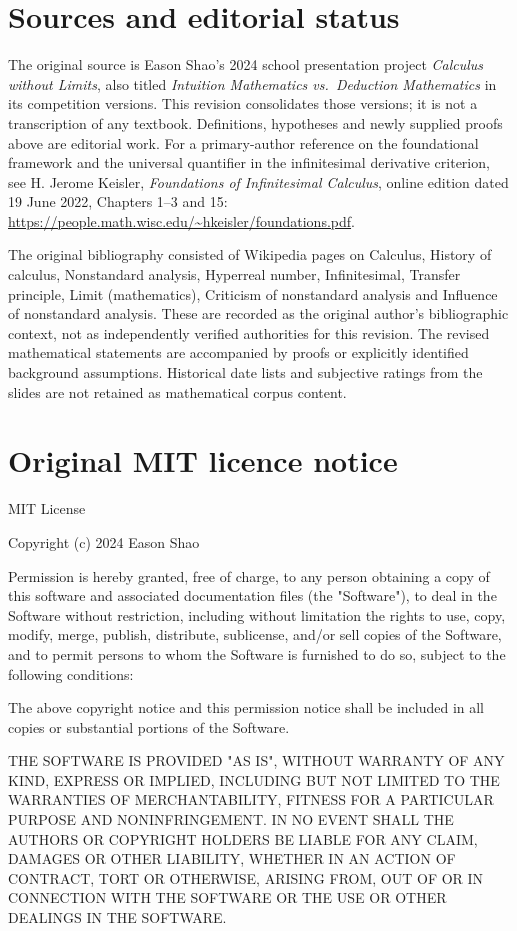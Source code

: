 \documentclass[11pt]{article}
\theoremstyle{definition}
\theoremstyle{remark}
\begin{document}
\section*{Sources and editorial status}
The original source is Eason Shao's 2024 school presentation project
\emph{Calculus without Limits}, also titled \emph{Intuition Mathematics vs.\ Deduction
Mathematics} in its competition versions. This revision consolidates those
versions; it is not a transcription of any textbook. Definitions, hypotheses
and newly supplied proofs above are editorial work.
For a primary-author reference on the foundational framework and the universal
quantifier in the infinitesimal derivative criterion, see H. Jerome Keisler,
\emph{Foundations of Infinitesimal Calculus}, online edition dated 19 June 2022,
Chapters 1--3 and 15:
\url{https://people.math.wisc.edu/~hkeisler/foundations.pdf}.

The original bibliography consisted of Wikipedia pages on Calculus,
History of calculus, Nonstandard analysis, Hyperreal number, Infinitesimal,
Transfer principle, Limit (mathematics), Criticism of nonstandard analysis and
Influence of nonstandard analysis. These are recorded as the original author's
bibliographic context, not as independently verified authorities for this revision.
The revised mathematical statements are accompanied by proofs or explicitly
identified background assumptions. Historical date lists and subjective ratings
from the slides are not retained as mathematical corpus content.

\appendix
\section{Original MIT licence notice}\label{app:license}
\begingroup\small
MIT License

Copyright (c) 2024 Eason Shao

Permission is hereby granted, free of charge, to any person obtaining a copy
of this software and associated documentation files (the "Software"), to deal
in the Software without restriction, including without limitation the rights
to use, copy, modify, merge, publish, distribute, sublicense, and/or sell
copies of the Software, and to permit persons to whom the Software is
furnished to do so, subject to the following conditions:

The above copyright notice and this permission notice shall be included in all
copies or substantial portions of the Software.

THE SOFTWARE IS PROVIDED "AS IS", WITHOUT WARRANTY OF ANY KIND, EXPRESS OR
IMPLIED, INCLUDING BUT NOT LIMITED TO THE WARRANTIES OF MERCHANTABILITY,
FITNESS FOR A PARTICULAR PURPOSE AND NONINFRINGEMENT. IN NO EVENT SHALL THE
AUTHORS OR COPYRIGHT HOLDERS BE LIABLE FOR ANY CLAIM, DAMAGES OR OTHER
LIABILITY, WHETHER IN AN ACTION OF CONTRACT, TORT OR OTHERWISE, ARISING FROM,
OUT OF OR IN CONNECTION WITH THE SOFTWARE OR THE USE OR OTHER DEALINGS IN THE
SOFTWARE.

\endgroup
\end{document}
